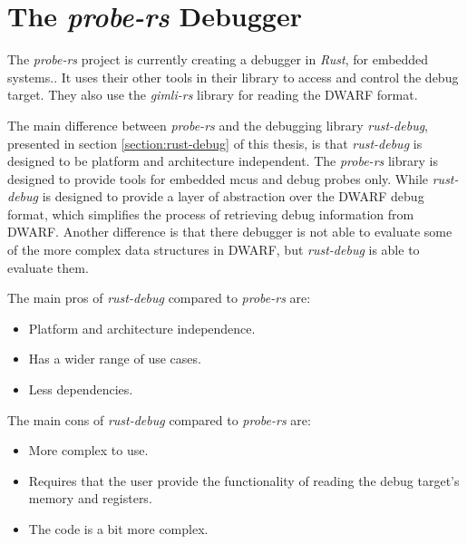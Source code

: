 

\section{The \emph{probe-rs} Debugger}

The \emph{probe-rs} project is currently creating a debugger in \emph{Rust}, for embedded systems..
It uses their other tools in their library to access and control the debug target.
They also use the \emph{gimli-rs} library for reading the \gls{DWARF} format.


The main difference between \emph{probe-rs} and the debugging library \emph{rust-debug}, presented in section \ref{section:rust-debug} of this thesis, is that \emph{rust-debug} is designed to be platform and architecture independent.
The \emph{probe-rs} library is designed to provide tools for embedded \glspl{mcu} and debug probes only.
While \emph{rust-debug} is designed to provide a layer of abstraction over the \gls{DWARF} debug format, which simplifies the process of retrieving debug information from \gls{DWARF}.
Another difference is that there debugger is not able to evaluate some of the more complex data structures in \gls{DWARF}, but \emph{rust-debug} is able to evaluate them.

The main pros of \emph{rust-debug} compared to \emph{probe-rs} are:
\begin{itemize}
  \item Platform and architecture independence.
  \item Has a wider range of use cases.
  \item Less dependencies.
\end{itemize}

The main cons of \emph{rust-debug} compared to \emph{probe-rs} are:
\begin{itemize}
  \item More complex to use.
  \item Requires that the user provide the functionality of reading the debug target's memory and registers.
  \item The code is a bit more complex.
\end{itemize}





